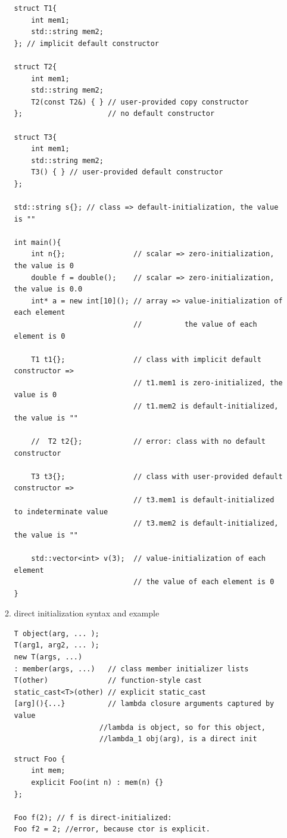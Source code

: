 \documentclass[a4paper,11pt,twoside]{book}
\begin{document}
\begin{itemize}
\begin{enumerate}
\begin{lstlisting}
struct T1{
	int mem1;
	std::string mem2;
}; // implicit default constructor

struct T2{
	int mem1;
	std::string mem2;
	T2(const T2&) { } // user-provided copy constructor
};                    // no default constructor

struct T3{
	int mem1;
	std::string mem2;
	T3() { } // user-provided default constructor
};

std::string s{}; // class => default-initialization, the value is ""

int main(){
	int n{};                // scalar => zero-initialization, the value is 0
	double f = double();    // scalar => zero-initialization, the value is 0.0
	int* a = new int[10](); // array => value-initialization of each element
							//          the value of each element is 0
							
	T1 t1{};                // class with implicit default constructor =>
							// t1.mem1 is zero-initialized, the value is 0
							// t1.mem2 is default-initialized, the value is ""
							
	//  T2 t2{};            // error: class with no default constructor
	
	T3 t3{};                // class with user-provided default constructor =>
							// t3.mem1 is default-initialized to indeterminate value
							// t3.mem2 is default-initialized, the value is ""
							
	std::vector<int> v(3);  // value-initialization of each element
							// the value of each element is 0
}
\end{lstlisting}


		\item direct initialization syntax and example
\begin{lstlisting}[numbers=none]
T object(arg, ... );
T(arg1, arg2, ... );
new T(args, ...)
: member(args, ...)   // class member initializer lists
T(other)              // function-style cast
static_cast<T>(other) // explicit static_cast
[arg](){...}          // lambda closure arguments captured by value
					//lambda is object, so for this object, 
					//lambda_1 obj(arg), is a direct init
\end{lstlisting}



\begin{lstlisting}[numbers=none]
struct Foo {
	int mem;
	explicit Foo(int n) : mem(n) {}
};

Foo f(2); // f is direct-initialized:
Foo f2 = 2; //error, because ctor is explicit.
\end{lstlisting}



\end{enumerate}
\end{itemize}
\end{document}
